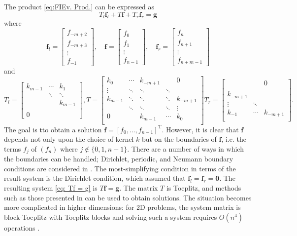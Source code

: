 \documentclass[12pt,notitlepage]{report}
\newcommand{\gVec}{\mathbf{g}}	%
\newcommand{\fVec}{\mathbf{f}}	%
\newcommand{\trans}{\mathrm{T}}	%
\begin{document}
The product \eqref{eq:FIEv. Prod.} can be expressed as
\begin{equation}
\label{eq: Tf = g}
T_{l}\fVec_{l} + T\fVec + T_{r}\fVec_{r} = \gVec
\end{equation}
where
\[\fVec_{l} = \begin{bmatrix}
f_{-m+2} \\
f_{-m+3} \\
\vdots \\
f_{-1}
\end{bmatrix}, \quad \fVec = \begin{bmatrix}
f_{0} \\
f_{1} \\
\vdots \\
f_{n-1}
\end{bmatrix}, \quad \fVec_{r} = \begin{bmatrix}
f_{n} \\
f_{n+1} \\
\vdots \\
f_{n+m-1}
\end{bmatrix}\]
and
\[T_{l} = \begin{bmatrix}
k_{m-1} & \cdots & k_{1} \\
 & \ddots & \ddots \\
 & & k_{m-1} \\
 & & \\
0 & & 
\end{bmatrix},
T = \begin{bmatrix}
k_{0} & \cdots & k_{-m+1} & & 0 \\
\vdots & \ddots & \ddots & \ddots &  \\
k_{m-1} & \ddots & \ddots & \ddots & k_{-m+1} \\
 & \ddots & \ddots & \ddots & \vdots \\
0 & & k_{m-1} & \cdots & k_{0} \\
\end{bmatrix}
T_{r} = \begin{bmatrix}
 & & 0 \\
 & & \\
k_{-m+1} & & \\
\vdots & \ddots &  \\
k_{-1} & \cdots & k_{-m+1} \\
\end{bmatrix}.\]
The goal is tto obtain a solution $\fVec = [f_0,\ldots,f_{n-1}]^\trans$. However, it is clear that $\fVec$ depends not only upon the choice of kernel $k$ but on the boundaries of $\fVec$, i.e. the terms $f_j$ of $(f_n)$ where $j \not\in \{0,1,n-1\}$. There are a number of ways in which the boundaries can be handled; Dirichlet, periodic, and Neumann boundary conditions are considered in \cite{NeumannDCT}. The most-simplifying condition in terms of the result system is the Dirichlet condition, which assumed that $\fVec_l = \fVec_r = \bm{0}$. The resulting system \eqref{eq: Tf = g} is $T\fVec = \gVec$. The matrix $T$ is Toeplitz, and methods such as those presented in \cite{Vogel:2002} can be used to obtain solutions. The situation becomes more complicated in higher dimensions: for 2D problems, the system matrix is block-Toeplitz with Toeplitz blocks and solving such a system requires $O(n^4)$ operations \cite{KalouptsidisCarayannisManolakis}. \par 
\end{document}
